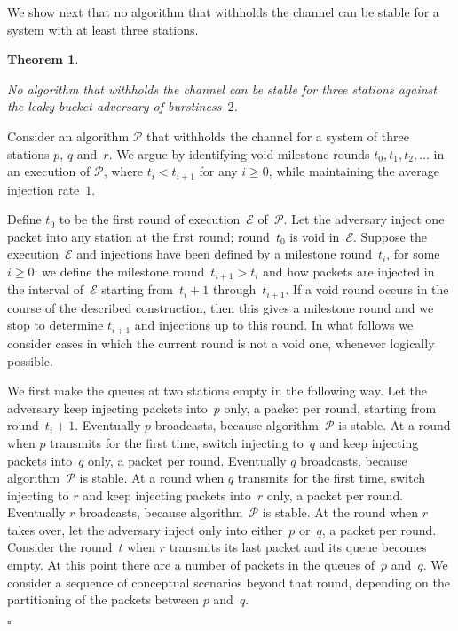 \documentclass[11pt]{article}
\newcommand{\cE}{\mathcal{E}}
\newcommand{\cP}{\mathcal{P}}
\newcommand{\qed}{\hfill $\square$ \smallbreak}
\newenvironment{proof}{\noindent{\bf Proof:}}{\qed}
\newtheorem{theorem}{Theorem}
\begin{document}
We show next that no algorithm that withholds the channel can be stable for a system with at least three stations.




\begin{theorem}
\label{thm:impossible-3-stations-withhold-stable}

No algorithm that withholds the channel can be stable for three stations against the leaky-bucket  adversary of burstiness~$2$.
\end{theorem}

\begin{proof}
Consider an algorithm $\cP$ that withholds the channel for a system of three stations $p$, $q$ and~$r$.
We argue by  identifying void milestone rounds $t_{0}, t_{1},t_{2},\ldots$ in an execution of $\cP$, where $t_{i}<t_{i+1}$ for any $i\ge 0$, while maintaining the average injection rate~$1$. 

Define $t_{0}$ to be the first round of execution~$\cE$ of~$\cP$.
Let the adversary inject one packet into any station at the first round; round~$t_0$ is void in~$\cE$.
Suppose the execution~$\cE$ and injections have been defined by a milestone round~$t_{i}$, for some $i\ge 0$: we define the milestone round~$t_{i+1}>t_{i}$ and how packets are injected in the interval of~$\cE$ starting from~$t_{i}+1$ through~$t_{i+1}$.
If a void round occurs in the course of the described construction, then this gives a milestone round and we stop to determine $t_{i+1}$ and injections up to this round.
In what follows we consider cases in which the current round is not a void one, whenever logically possible.

We first make the queues at two stations empty in the following way.
Let the adversary keep injecting packets into~$p$ only, a packet per round, starting from round~$t_i+1$.
Eventually $p$ broadcasts, because algorithm~$\cP$ is stable.
At a round when $p$ transmits for the first time, switch injecting to~$q$ and keep injecting packets into~$q$ only, a packet per round.
Eventually $q$ broadcasts, because algorithm~$\cP$ is stable.
At a round when $q$ transmits for the first time, switch injecting to $r$ and keep injecting packets into~$r$ only, a packet per round.
Eventually $r$ broadcasts, because algorithm~$\cP$ is stable.
At the round when $r$ takes over, let the adversary inject only into either~$p$ or~$q$, a packet per round.
Consider the round~$t$ when $r$ transmits its last packet and its queue becomes empty.
At this point there are a number of packets in the queues of~$p$ and~$q$.
We consider a sequence of conceptual scenarios beyond that round, depending on the partitioning of the packets between $p$ and~$q$.


\end{proof}
\end{document}

